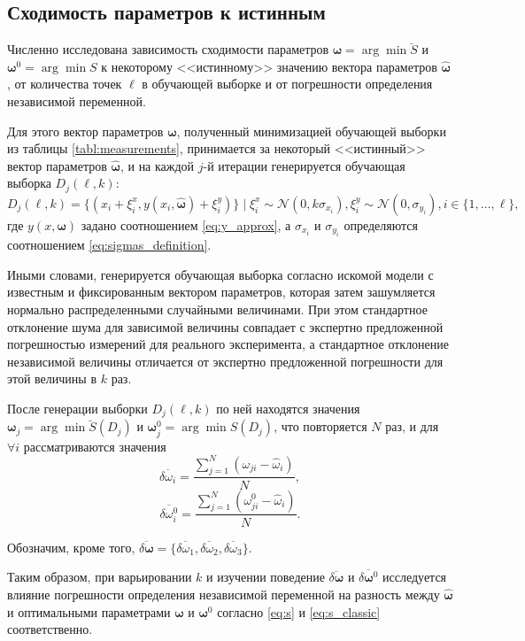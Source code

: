 \documentclass[tikz,10pt,a4paper]{article}
\newcommand{\bomega}{\boldsymbol{\omega}}
\begin{document}
\subsection{Сходимость параметров к истинным}
Численно исследована зависимость сходимости параметров $\bomega = \arg \min \breve{S}$
и $\bomega^0 = \arg \min S$ к некоторому <<истинному>> значению вектора параметров
$\hat{\bomega}$, от количества точек $\ell$ в обучающей выборке и от погрешности определения
независимой переменной.

Для этого вектор параметров $\bomega$, полученный минимизацией обучающей выборки из таблицы
\ref{tabl:measurements}, принимается за некоторый <<истинный>> вектор параметров $\hat{\bomega}$,
и на каждой $j$-й итерации генерируется обучающая выборка $D_j(\ell, k)$:
\[
  D_j(\ell, k) = \{ (x_i + \xi^x_i, y(x_i, \hat{\bomega}) + \xi^y_i) \} \mid \xi^x_i \sim \mathcal{N}(0, k \sigma_{x_i}), \xi^y_i \sim \mathcal{N}(0, \sigma_{y_i}), i \in \{ 1, \dots, \ell \},
\]
где $y(x, \bomega)$ задано соотношением \eqref{eq:y_approx}, а $\sigma_{x_i}$ и $\sigma_{y_i}$
определяются соотношением \eqref{eq:sigmas_definition}.

Иными словами, генерируется обучающая выборка согласно искомой модели с
известным и фиксированным вектором параметров, которая затем зашумляется нормально
распределенными случайными величинами. При этом стандартное отклонение
шума для зависимой величины совпадает с экспертно предложенной погрешностью
измерений для реального эксперимента, а стандартное отклонение независимой
величины отличается от экспертно предложенной погрешности для этой величины
в $k$ раз.

После генерации выборки $D_j(\ell, k)$ по ней находятся значения $\bomega_j = \arg \min \breve{S}(D_j)$
и $\bomega_j^0 = \arg \min S(D_j)$, что повторяется $N$ раз, и для $\forall i$ рассматриваются значения
\[
  \overline{\delta \omega_i} = \frac{\sum_{j = 1}^N (\omega_{ji} - \hat{\omega}_i)}{N},
\]
\[
  \overline{\delta \omega^0_i} = \frac{\sum_{j = 1}^N (\omega^0_{ji} - \hat{\omega}_i)}{N}.
\]

Обозначим, кроме того, $\overline{\delta \bomega} = \{ \overline{\delta \omega_1}, \overline{\delta \omega_2}, \overline{\delta \omega_3} \}$.

Таким образом, при варьировании $k$ и изучении поведение $\overline{\delta \bomega}$ и
$\overline{\delta \bomega^0}$ исследуется влияние погрешности определения
независимой переменной на разность между $\hat{\bomega}$ и оптимальными
параметрами $\bomega$ и $\bomega^0$ согласно \eqref{eq:s} и \eqref{eq:s_classic}
соответственно.
\end{document}
